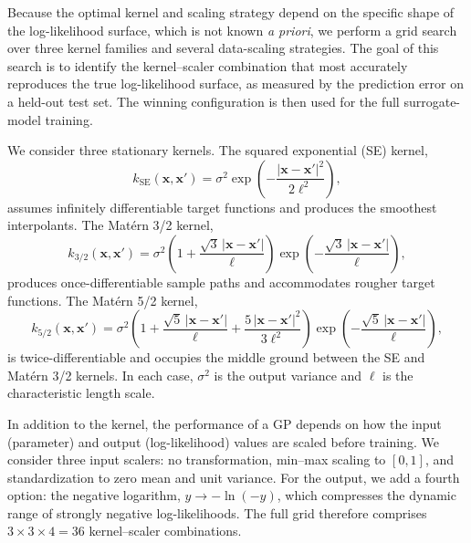 Because the optimal kernel and scaling strategy depend on the specific
shape of the log-likelihood surface, which is not known \emph{a
priori}, we perform a grid search over three kernel families and
several data-scaling strategies. The goal of this search is to
identify the kernel--scaler combination that most accurately
reproduces the true log-likelihood surface, as measured by the
prediction error on a held-out test set. The winning configuration is
then used for the full surrogate-model training.

We consider three stationary kernels. The squared exponential (SE)
kernel,
\begin{equation}
  k_{\mathrm{SE}}(\mathbf{x}, \mathbf{x}') = \sigma^{2}
  \exp\!\left(-\frac{|\mathbf{x} - \mathbf{x}'|^{2}}{2\ell^{2}}\right),
  \label{eq:se_kernel}
\end{equation}
assumes infinitely differentiable target functions and produces the
smoothest interpolants. The Mat\'{e}rn 3/2 kernel,
\begin{equation}
  k_{3/2}(\mathbf{x}, \mathbf{x}') = \sigma^{2}
  \left(1 + \frac{\sqrt{3}\,|\mathbf{x} - \mathbf{x}'|}{\ell}\right)
  \exp\!\left(-\frac{\sqrt{3}\,|\mathbf{x} - \mathbf{x}'|}{\ell}\right),
  \label{eq:matern32_kernel}
\end{equation}
produces once-differentiable sample paths and accommodates rougher
target functions. The Mat\'{e}rn 5/2 kernel,
\begin{equation}
  k_{5/2}(\mathbf{x}, \mathbf{x}') = \sigma^{2}
  \left(1 + \frac{\sqrt{5}\,|\mathbf{x} - \mathbf{x}'|}{\ell}
  + \frac{5\,|\mathbf{x} - \mathbf{x}'|^{2}}{3\ell^{2}}\right)
  \exp\!\left(-\frac{\sqrt{5}\,|\mathbf{x} - \mathbf{x}'|}{\ell}\right),
  \label{eq:matern52_kernel}
\end{equation}
is twice-differentiable and occupies the middle ground between the SE
and Mat\'{e}rn 3/2 kernels. In each case, $\sigma^{2}$ is the output
variance and $\ell$ is the characteristic length scale.

In addition to the kernel, the performance of a GP depends on how
the input (parameter) and output (log-likelihood) values are scaled
before training. We consider three input scalers: no transformation,
min--max scaling to $[0,1]$, and standardization to zero mean and unit
variance. For the output, we add a fourth option: the negative
logarithm, $y \to -\!\ln(-y)$, which compresses the dynamic range of
strongly negative log-likelihoods. The full grid therefore comprises
$3 \times 3 \times 4 = 36$ kernel--scaler combinations.

